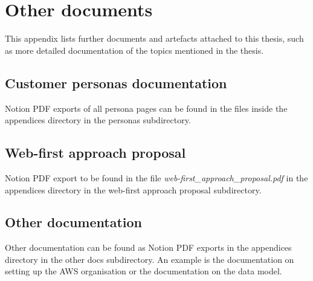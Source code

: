\chapter{Other documents}
\label{appendix7-other-documents}

This appendix lists further documents and artefacts attached to this thesis, such as more detailed documentation of the topics mentioned in the thesis.

\section*{Customer personas documentation}

Notion PDF exports of all persona pages can be found in the files inside the appendices directory in the personas subdirectory.

\section*{Web-first approach proposal}

Notion PDF export to be found in the file \textit{web-first\_approach\_proposal.pdf} in the appendices directory in the web-first approach proposal subdirectory.

\section*{Other documentation}

Other documentation can be found as Notion PDF exports in the appendices directory in the other docs subdirectory. An example is the documentation on setting up the AWS organisation or the documentation on the data model.

